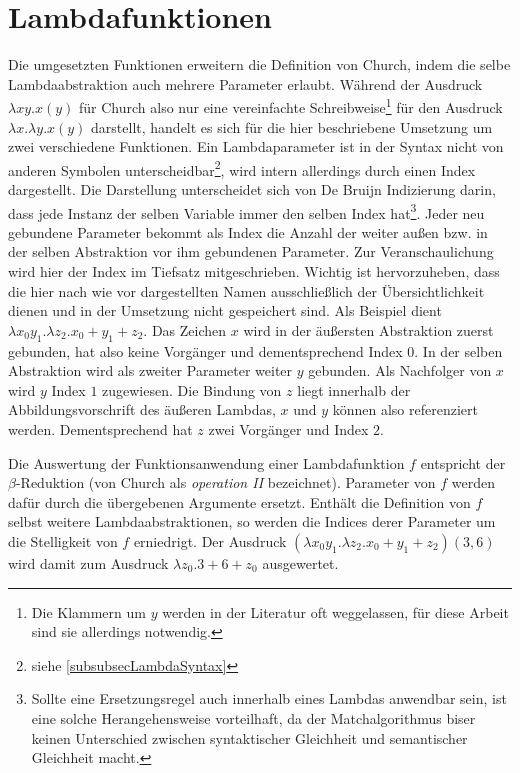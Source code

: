 \section{Lambdafunktionen} \label{subsecLambdafunktionen}
Die umgesetzten Funktionen erweitern die Definition von Church, indem die selbe Lambdaabstraktion auch mehrere Parameter erlaubt. Während der Ausdruck $\lambda x y . x(y)$ für Church also nur eine vereinfachte Schreibweise\footnote{Die Klammern um $y$ werden in der Literatur oft weggelassen, für diese Arbeit sind sie allerdings notwendig.} für den Ausdruck $\lambda x .\lambda y .x(y)$ darstellt, handelt es sich für die hier beschriebene Umsetzung um zwei verschiedene Funktionen. 
Ein Lambdaparameter ist in der Syntax nicht von anderen Symbolen unterscheidbar\footnote{siehe \ref{subsubsecLambdaSyntax}}, wird intern allerdings durch einen Index dargestellt. Die Darstellung unterscheidet sich von De Bruijn Indizierung \cite{deBruijn} darin, dass jede Instanz der selben Variable immer den selben Index hat\footnote{Sollte eine Ersetzungsregel auch innerhalb eines Lambdas anwendbar sein, ist eine solche Herangehensweise vorteilhaft, da der Matchalgorithmus biser keinen Unterschied zwischen syntaktischer Gleichheit und semantischer Gleichheit macht.}.
 Jeder neu gebundene Parameter bekommt als Index die Anzahl der weiter außen bzw. in der selben Abstraktion vor ihm gebundenen Parameter. Zur Veranschaulichung wird hier der Index im Tiefsatz mitgeschrieben. Wichtig ist hervorzuheben, dass die hier nach wie vor dargestellten Namen ausschließlich der Übersichtlichkeit dienen und in der Umsetzung nicht gespeichert sind.
 Als Beispiel dient $\lambda x_0 y_1 .\lambda z_2 .x_0 + y_1 + z_2$. Das Zeichen $x$ wird in der äußersten Abstraktion zuerst gebunden, hat also keine Vorgänger und dementsprechend Index $0$. In der selben Abstraktion wird als zweiter Parameter weiter $y$ gebunden. Als Nachfolger von $x$ wird $y$ Index $1$ zugewiesen. Die Bindung von $z$ liegt innerhalb der Abbildungsvorschrift des äußeren Lambdas, $x$ und $y$ können also referenziert werden. Dementsprechend hat $z$ zwei Vorgänger und Index $2$. 
 
 Die Auswertung der Funktionsanwendung einer Lambdafunktion $f$ entspricht der $\beta$-Reduktion (von Church \cite{ChurchLambda36} als \emph{operation II} bezeichnet). Parameter von $f$ werden dafür durch die übergebenen Argumente ersetzt. Enthält die Definition von $f$ selbst weitere Lambdaabstraktionen, so werden die Indices derer Parameter um die Stelligkeit von $f$ erniedrigt.
 Der Ausdruck $(\lambda x_0 y_1 .\lambda z_2 .x_0 + y_1 + z_2)(3, 6)$ wird damit zum Ausdruck $\lambda z_0 .3 + 6 + z_0$ ausgewertet.
 
